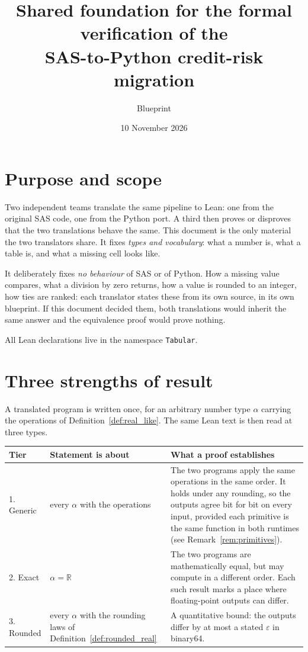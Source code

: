 \documentclass[11pt,a4paper]{article}
\title{Shared foundation for the formal verification of the\\ SAS-to-Python credit-risk migration}
\author{Blueprint \code{credit-risk-foundation}}
\date{10 November 2026}
\theoremstyle{definition}
\theoremstyle{plain}
\theoremstyle{remark}
\newcommand{\R}{\mathbb{R}}
\newcommand{\code}[1]{\texttt{#1}}
\begin{document}
\maketitle

\section{Purpose and scope}

Two independent teams translate the same pipeline to Lean: one from the original SAS code, one
from the Python port. A third then proves or disproves that the two translations behave the
same. This document is the only material the two translators share. It fixes \emph{types and
vocabulary}: what a number is, what a table is, and what a missing cell looks like.

It deliberately fixes \emph{no behaviour} of SAS or of Python. How a missing value compares,
what a division by zero returns, how a value is rounded to an integer, how ties are ranked:
each translator states these from its own source, in its own blueprint. If this document
decided them, both translations would inherit the same answer and the equivalence proof would
prove nothing.

All Lean declarations live in the namespace \code{Tabular}.

\section{Three strengths of result}\label{sec:tiers}

A translated program is written once, for an arbitrary number type $\alpha$ carrying the
operations of Definition~\ref{def:real_like}. The same Lean text is then read at three types.

\begin{center}
\begin{tabular}{@{}lp{3.6cm}p{9.4cm}@{}}
\toprule
Tier & Statement is about & What a proof establishes \\
\midrule
1. Generic & every $\alpha$ with the operations & The two programs apply the same operations
in the same order. It holds under any rounding, so the outputs agree bit for bit on every
input, provided each primitive is the same function in both runtimes (see
Remark~\ref{rem:primitives}). \\
2. Exact & $\alpha = \R$ & The two programs are mathematically equal, but may compute in a
different order. Each such result marks a place where floating-point outputs can differ. \\
3. Rounded & every $\alpha$ with the rounding laws of Definition~\ref{def:rounded_real} & A
quantitative bound: the outputs differ by at most a stated $\varepsilon$ in binary64. \\
\bottomrule
\end{tabular}
\end{center}
\end{document}

